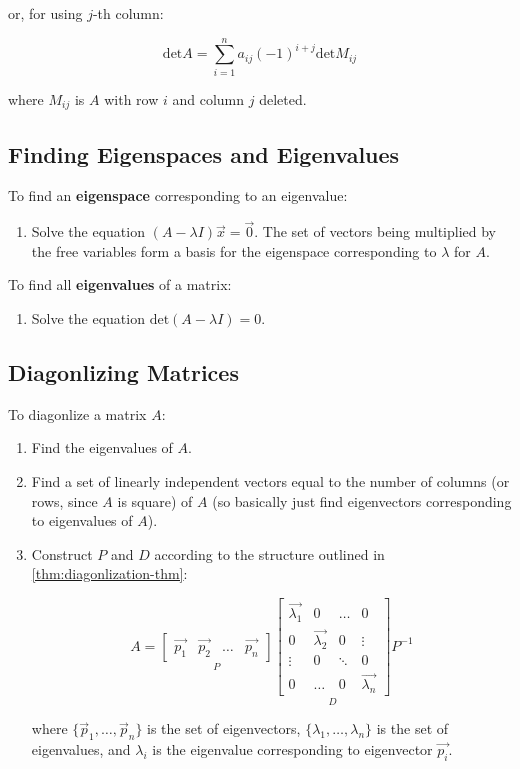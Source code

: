 \documentclass[a4paper,12pt]{article}
\theoremstyle{definition}
\theoremstyle{definition}
\newcommand{\finitevecs}[2]{#1_1,\ldots,#1_#2}
\newcommand{\finitevecsset}[2]{\{\finitevecs{#1}{#2}\}}
\newcommand{\chareq}{\text{det}(A - \lambda I) = 0}
\begin{document}
	or, for using $j$-th column:
	
	\begin{equation*}
		\text{det}A = \sum_{i = 1}^{n}a_{ij}(-1)^{i + j}\text{det}M_{ij}
	\end{equation*}
	
	where $M_{ij}$ is $A$ with row $i$ and column $j$ deleted.
	
	\subsection{Finding Eigenspaces and Eigenvalues}
	\label{sec:finding-eigenspcs-and-eigenvals}
	To find an \textbf{eigenspace} corresponding to an eigenvalue:
	\begin{enumerate}
		\item Solve the equation $(A - \lambda I)\vec{x} = \vec{0}$. The set of vectors being multiplied by the free variables form a basis for the eigenspace corresponding to $\lambda$ for $A$.
	\end{enumerate}
	
	To find all \textbf{eigenvalues} of a matrix:
	\begin{enumerate}
		\item Solve the equation $\chareq$.
	\end{enumerate}
	
	\subsection{Diagonlizing Matrices}
	\label{sec:diagonlizing-matrices}
	To diagonlize a matrix $A$:
	\begin{enumerate}
		\item Find the eigenvalues of $A$.
		
		\item Find a set of linearly independent vectors equal to the number of columns (or rows, since $A$ is square) of $A$ (so basically just find eigenvectors corresponding to eigenvalues of $A$).
		
		\item Construct $P$ and $D$ according to the structure outlined in \autoref{thm:diagonlization-thm}:
		
		\begin{equation*}
			A =
			\underset{P}{
				\begin{bmatrix}
					\vec{p_1} & \vec{p_2} & \ldots & \vec{p_n}
				\end{bmatrix}
			}
			\underset{D}{
				\begin{bmatrix}
					\vec{\lambda_1} & 0 & \ldots & 0\\
					0 & \vec{\lambda_2} & 0 & \vdots\\
					\vdots & 0 & \ddots & 0\\
					0 & \ldots & 0 & \vec{\lambda_n}
				\end{bmatrix}
			}
			P^{-1}
		\end{equation*}
		
		where $\finitevecsset{\vec{p}}{n}$ is the set of eigenvectors, $\finitevecsset{\lambda}{n}$ is the set of eigenvalues, and $\lambda_i$ is the eigenvalue corresponding to eigenvector $\vec{p_i}$.
	\end{enumerate}
	
\end{document}
